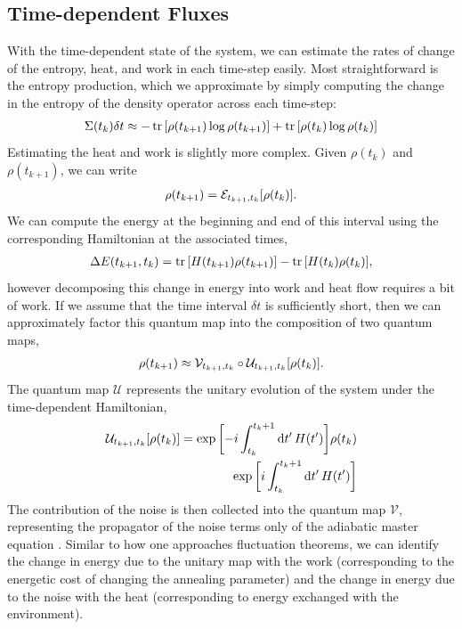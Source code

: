\documentclass[aps,pra,amsmath,amssymb,amsfonts,lengthcheck,twocolumn,superscriptaddress]{revtex4-1}
\begin{document}
\subsection{Time-dependent Fluxes}

With the time-dependent state of the system, we can estimate the rates of change of the entropy, heat, and work in each time-step easily.
Most straightforward is the entropy production, which we approximate by simply computing the change in the entropy of the density operator across each time-step:
\begin{align}
    \Sigma(t_k)\delta t \approx -\tr\bqty{\rho(t_{k+1})\log\rho(t_{k+1})} + \tr\bqty{\rho(t_k)\log\rho(t_k)}
\end{align}
Estimating the heat and work is slightly more complex. 
Given $\rho(t_k)$ and $\rho(t_{k+1})$, we can write 
\begin{align}
    \rho(t_{k+1}) = \mathcal{E}_{t_{k+1}, t_k}\bqty{\rho(t_{k})}
    .
\end{align}
We can compute the energy at the beginning and end of this interval using the corresponding Hamiltonian at the associated times,
\begin{align}
    \Delta E(t_{k+1}, t_k) = \tr\bqty{H(t_{k+1})\rho(t_{k+1})} - \tr\bqty{H(t_k)\rho(t_k)}
    ,
\end{align}
however decomposing this change in energy into work and heat flow requires a bit of work.
If we assume that the time interval $\delta t$ is sufficiently short, then we can approximately factor this quantum map into the composition of two quantum maps,
\begin{align}
    \rho(t_{k+1}) \approx \mathcal{V}_{t_{k+1},t_k}\circ\mathcal{U}_{t_{k+1},t_k}\bqty{\rho(t_{k})}
    .
\end{align}
The quantum map $\mathcal{U}$ represents the unitary evolution of the system under the time-dependent Hamiltonian,
\begin{align}
    \mathcal{U}_{t_{k+1},t_k}\bqty{\rho(t_{k})} = \exp\bqty{-i\int_{t_k}^{t_k+1} \dd{t'} H(t')} \rho(t_{k}) \\ \exp\bqty{i\int_{t_k}^{t_k+1} \dd{t'} H(t')}
\end{align}
The contribution of the noise is then collected into the quantum map $\mathcal{V}$, representing the propagator of the noise terms only of the adiabatic master equation \cite{Albash2012}.
Similar to how one approaches fluctuation theorems, we can identify the change in energy due to the unitary map with the work (corresponding to the energetic cost of changing the annealing parameter) and the change in energy due to the noise with the heat (corresponding to energy exchanged with the environment).
\end{document}
